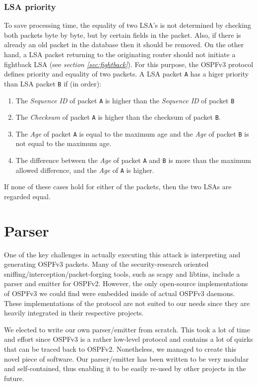 \documentclass[11pt,a4paper,oneside]{article}
\newcommand{\lsection}[2]{\section{#1}\label{sec:#2}}
\newcommand{\lsubsubsection}[2]{\subsubsection{#1}\label{sec:#2}}
\begin{document}
    \lsubsubsection{LSA priority}{lsa_priority}
    To save processing time, the equality of two LSA's is not determined by checking both packets byte by byte, but by certain fields in the packet. Also, if there is already an old packet in the database then it should be removed. On the other hand, a LSA packet returning to the originating router should not initiate a fightback LSA (see \textit{section \ref{sec:fightback}}). For this purpose, the OSPFv3 protocol defines priority and equality of two packets.
    A LSA packet \texttt{A} has a higer priority than LSA packet \texttt{B} if (in order):
    \begin{enumerate}
        \item The \textit{Sequence ID} of packet \texttt{A} is higher than the \textit{Sequence ID} of packet \texttt{B}
        \item The \textit{Checksum} of packet \texttt{A} is higher than the checksum of packet \texttt{B}.
        \item The \textit{Age} of packet \texttt{A} is equal to the maximum age and the \textit{Age} of packet \texttt{B} is not equal to the maximum age.
        \item The difference between the \textit{Age} of packet \texttt{A} and \texttt{B} is more than the maximum allowed difference, and the \textit{Age} of \texttt{A} is higher.
    \end{enumerate}
    If none of these cases hold for either of the packets, then the two LSAs are regarded equal.
    \lsection{Parser}{parser}
    One of the key challenges in actually executing this attack is interpreting and generating OSPFv3 packets.
    Many of the security-research oriented sniffing/interception/packet-forging tools, such as scapy and libtins, include a parser and emitter for OSPFv2.
    However, the only open-source implementations of OSPFv3 we could find were embedded inside of actual OSPFv3 daemons.
    These implementations of the protocol are not suited to our needs since they are heavily integrated in their respective projects.

    We elected to write our own parser/emitter from scratch.
    This took a lot of time and effort since OSPFv3 is a rather low-level protocol and contains a lot of quirks that can be traced back to OSPFv2.
    Nonetheless, we managed to create this novel piece of software.
    Our parser/emitter has been written to be very modular and self-contained, thus enabling it to be easily re-used by other projects in the future.
\end{document}
